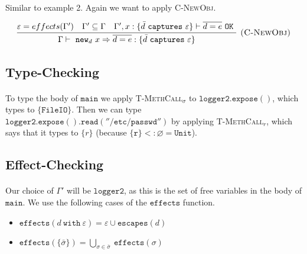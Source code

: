 \documentclass{llncs}
\newcommand{\keywadj}[1]{\mathtt{#1}}
\newcommand{\keyw}[1]{\keywadj{#1}~}
\begin{document}
\paragraph{}
Similar to example 2. Again we want to apply \textsc{C-NewObj}.


\[
\begin{array}{c}
\infer[\textsc{(C-NewObj)}]
	{\Gamma \vdash~\keywadj{new}_d~x \Rightarrow \overline{d = e} : \{  \bar d~\keyw{captures} \varepsilon \} }
	{\varepsilon = effects(\Gamma') & \Gamma' \subseteq \Gamma & \Gamma', x : \{ \bar d~\keyw {captures} \varepsilon \} \vdash \overline{d = e}~\keyw{OK}} \\
\end{array}
\]

\subsection*{Type-Checking}

\paragraph{}
To type the body of $\keywadj{main}$ we apply \textsc{T-MethCall$_\sigma$} to $\keywadj{logger2.expose()}$, which types to $\keywadj{\{FileIO\}}$. Then we can type  $\keywadj{logger2.expose().read(''/etc/passwd'')}$ by applying \textsc{T-MethCall$_r$}, which says that it types to $\{ r \}$ (because $\keywadj{\{ r \} <: \varnothing = Unit}$). 

\subsection*{Effect-Checking}

\paragraph{}
Our choice of $\keywadj{\Gamma'}$ will be $\keywadj{logger2}$, as this is the set of free variables in the body of $\keywadj{main}$. We use the following cases of the $\keywadj{effects}$ function.

\begin{itemize}
	\item $\keywadj{effects}(d~\keyw{with} \varepsilon) = \varepsilon \cup \keywadj{escapes}(d)$
	\item $\keywadj{effects}(\{\bar \sigma\}) = \bigcup_{\sigma \in \bar \sigma}~\keywadj{effects}(\sigma)$
\end{itemize}
\end{document}
